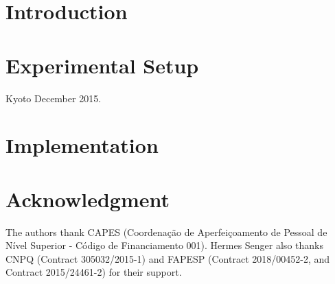 \documentclass[conference]{lib/IEEEtran}
\begin{document}
\section{Introduction}

\section{Experimental Setup}


Kyoto December 2015.

\section{Implementation}




\section*{Acknowledgment}

The authors thank CAPES (Coordenação de Aperfeiçoamento de Pessoal de Nível Superior - Código de Financiamento 001).
Hermes Senger also thanks CNPQ (Contract 305032/2015-1) and FAPESP (Contract 2018/00452-2, and Contract 2015/24461-2) for their support.


\end{document}
